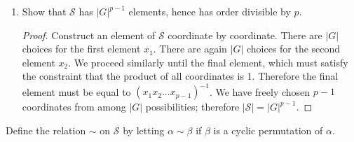 \documentclass{article}
\begin{document}
\begin{enumerate}[label=(\alph*), itemsep=0em]
    \item Show that $\mathcal{S}$ has $|G|^{p - 1}$ elements, hence has order divisible by $p$.
          \begin{proof}
            Construct an element of $\mathcal{S}$ coordinate by coordinate. There are $|G|$ choices for the first element $x_1$. There are again $|G|$ choices for the second element $x_2$. We proceed similarly until the final element, which must satisfy the constraint that the product of all coordinates is 1. Therefore the final element must be equal to $(x_1 x_2 ... x_{p - 1})^{-1}$. We have freely chosen $p - 1$ coordinates from among $|G|$ possibilities; therefore $|\mathcal{S}| = |G|^{p - 1}$.
          \end{proof}
\end{enumerate}
Define the relation $\sim$ on $\mathcal{S}$ by letting $\alpha \sim \beta$ if $\beta$ is a cyclic permutation of $\alpha$.
\end{document}
